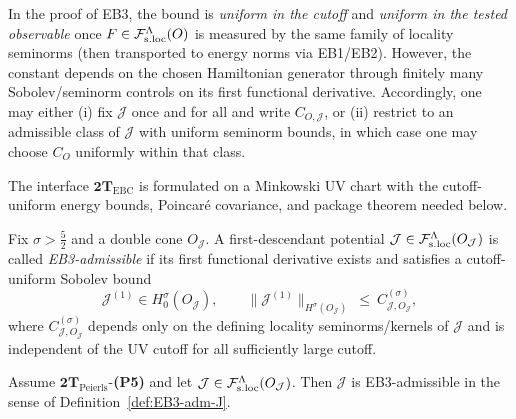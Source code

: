 \begin{remark}[Uniformity in EB3]
In the proof of EB3, the bound is \emph{uniform in the cutoff} and
\emph{uniform in the tested observable} once $F\in\mathcal F_{\mathrm{s.loc}}^\Lambda(O)$ is measured by the
same family of locality seminorms (then transported to energy norms via EB1/EB2).
However, the constant depends on the chosen Hamiltonian generator through finitely
many Sobolev/seminorm controls on its first functional derivative. Accordingly,
one may either (i) fix $\mathcal J$ once and for all and write $C_{O,\mathcal J}$,
or (ii) restrict to an admissible class of $\mathcal J$ with uniform seminorm bounds,
in which case one may choose $C_O$ uniformly within that class.
\end{remark}

\begin{remark}
The interface $\mathbf{2T}_{\mathrm{EBC}}$ is formulated on a Minkowski UV chart
with the cutoff-uniform energy bounds, Poincar\'e covariance, and package theorem
needed below.
\end{remark}

\begin{definition}
\label{def:EB3-adm-J}
Fix $\sigma>\frac52$ and a double cone $O_{\mathcal J}$. A first-descendant potential
$\mathcal J\in\mathcal F_{\mathrm{s.loc}}^\Lambda(O_{\mathcal J})$ is called \emph{EB3-admissible} if its first
functional derivative exists and satisfies a cutoff-uniform Sobolev bound
\[
\mathcal J^{(1)}\in H^\sigma_0(O_{\mathcal J}),
\qquad
\|\mathcal J^{(1)}\|_{H^\sigma(O_{\mathcal J})}\ \le\ C^{(\sigma)}_{\mathcal J,O_{\mathcal J}},
\]
where $C^{(\sigma)}_{\mathcal J,O_{\mathcal J}}$ depends only on the defining locality
seminorms/kernels of $\mathcal J$ and is independent of the UV cutoff for all
sufficiently large cutoff.
\end{definition}

\begin{lemma}
\label{lem:J-EB3-adm}
Assume $\mathbf{2T}_{\mathrm{Peierls}}$-\textbf{(P5)} and let
$\mathcal J\in\mathcal F_{\mathrm{s.loc}}^\Lambda(O_{\mathcal J})$. Then $\mathcal J$ is EB3-admissible in the
sense of Definition~\ref{def:EB3-adm-J}.
\end{lemma}

